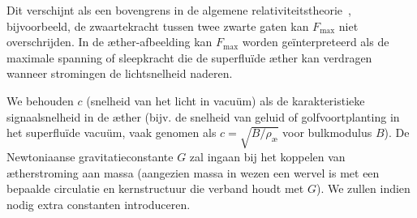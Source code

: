 Dit verschijnt als een bovengrens in de algemene relativiteitstheorie~\cite{Schiller2022-maxforce}, bijvoorbeeld, de zwaartekracht tussen twee zwarte gaten kan $F_\text{max}$ niet overschrijden. In de æther-afbeelding kan $F_\text{max}$ worden geïnterpreteerd als de maximale spanning of sleepkracht die de superfluïde æther kan verdragen wanneer stromingen de lichtsnelheid naderen.

We behouden $c$ (snelheid van het licht in vacuüm) als de karakteristieke signaalsnelheid in de æther (bijv. de snelheid van geluid of golfvoortplanting in het superfluïde vacuüm, vaak genomen als $c = \sqrt{B/\rho_{\text{\ae}}}$ voor bulkmodulus $B$). De Newtoniaanse gravitatieconstante $G$ zal ingaan bij het koppelen van ætherstroming aan massa (aangezien massa in wezen een wervel is met een bepaalde circulatie en kernstructuur die verband houdt met $G$). We zullen indien nodig extra constanten introduceren.